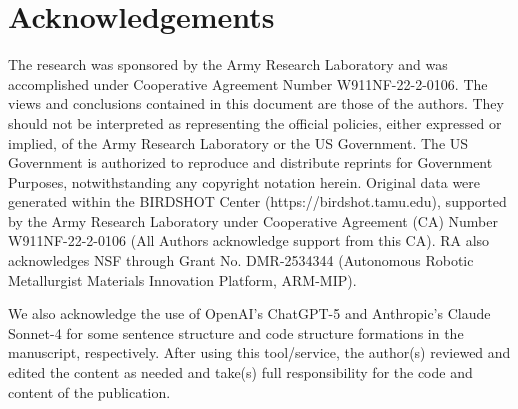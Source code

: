 \section*{Acknowledgements}
The research was sponsored by the Army Research Laboratory and was accomplished under Cooperative Agreement Number W911NF-22-2-0106. The views and conclusions contained in this document are those of the authors. They should not be interpreted as representing the official policies, either expressed or implied, of the Army Research Laboratory or the US Government. The US Government is authorized to reproduce and distribute reprints for Government Purposes, notwithstanding any copyright notation herein. Original data were generated within the BIRDSHOT Center (https://birdshot.tamu.edu), supported by the Army Research Laboratory under Cooperative Agreement (CA) Number W911NF-22-2-0106 (All Authors acknowledge support from this CA). RA also acknowledges NSF through Grant No. DMR-2534344 (Autonomous Robotic Metallurgist Materials Innovation Platform, ARM-MIP).

We also acknowledge the use of OpenAI's ChatGPT-5 and Anthropic's Claude Sonnet-4 for some sentence structure and code structure formations in the manuscript, respectively. After using this tool/service, the author(s) reviewed and edited the content as needed and take(s) full responsibility for the code and content of the publication. 
